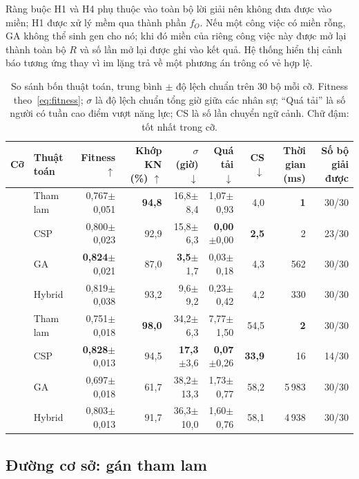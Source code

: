 \documentclass{IEEEtran}
\begin{document}
Ràng buộc H1 và H4 phụ thuộc vào toàn bộ lời giải nên không đưa được vào miền; H1 được xử lý mềm qua thành phần $f_O$. Nếu một công việc có miền rỗng, GA không thể sinh gen cho nó; khi đó miền của riêng công việc này được mở lại thành toàn bộ $R$ và số lần mở lại được ghi vào kết quả. Hệ thống hiển thị cảnh báo tương ứng thay vì im lặng trả về một phương án trông có vẻ hợp lệ.

\begin{table}[!t]
\centering
\caption{So sánh bốn thuật toán, trung bình $\pm$ độ lệch chuẩn trên 30 bộ mỗi cỡ. Fitness theo~\eqref{eq:fitness}; $\sigma$ là độ lệch chuẩn tổng giờ giữa các nhân sự; ``Quá tải'' là số người có tuần cao điểm vượt năng lực; CS là số lần chuyển ngữ cảnh. Chữ đậm: tốt nhất trong cỡ.}
\label{tab:main}
\begin{tabular}{llrrrrrrr}
\toprule
Cỡ & Thuật toán & Fitness $\uparrow$ & Khớp KN (\%) $\uparrow$ & $\sigma$ (giờ) $\downarrow$ & Quá tải $\downarrow$ & CS $\downarrow$ & Thời gian (ms) & Số bộ giải được \\
\midrule
{}
 & Tham lam & 0,767$\pm$0,051 & \textbf{94,8} & 16,8$\pm$8,4 & 1,07$\pm$0,93 & 4,0 & \textbf{1} & 30/30 \\
 & CSP      & 0,800$\pm$0,023 & 92,9 & 15,8$\pm$6,3 & \textbf{0,00}$\pm$0,00 & \textbf{2,5} & 2 & 23/30 \\
 & GA       & \textbf{0,824}$\pm$0,021 & 87,0 & \textbf{3,5}$\pm$1,7 & 0,03$\pm$0,18 & 4,3 & 562 & 30/30 \\
 & Hybrid   & 0,819$\pm$0,038 & 93,2 & 9,6$\pm$9,2 & 0,23$\pm$0,42 & 4,2 & 330 & 30/30 \\
\midrule
{}
 & Tham lam & 0,751$\pm$0,018 & \textbf{98,0} & 34,2$\pm$6,3 & 7,77$\pm$1,50 & 54,5 & \textbf{2} & 30/30 \\
 & CSP      & \textbf{0,828}$\pm$0,013 & 94,5 & \textbf{17,3}$\pm$3,6 & \textbf{0,07}$\pm$0,26 & \textbf{33,9} & 16 & 14/30 \\
 & GA       & 0,697$\pm$0,018 & 61,7 & 38,2$\pm$13,3 & 1,73$\pm$0,77 & 58,2 & 5\,983 & 30/30 \\
 & Hybrid   & 0,803$\pm$0,013 & 91,7 & 36,3$\pm$10,0 & 1,60$\pm$0,76 & 58,1 & 4\,938 & 30/30 \\
\bottomrule
\end{tabular}
\end{table}

\subsection{Đường cơ sở: gán tham lam}
\end{document}
